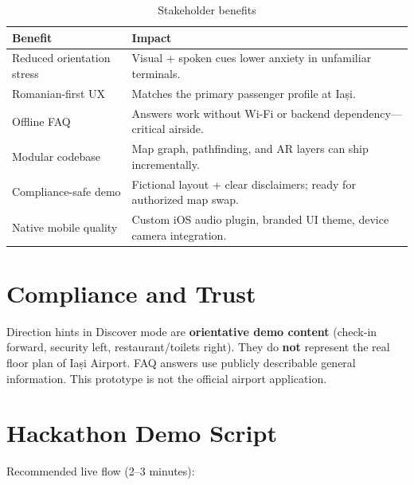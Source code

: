 \documentclass[11pt,a4paper]{article}
\begin{document}
\begin{table}[H]
\centering
\caption{Stakeholder benefits}
\begin{tabular}{@{}p{4.2cm}p{9.3cm}@{}}
\toprule
\textbf{Benefit} & \textbf{Impact} \\
\midrule
Reduced orientation stress & Visual + spoken cues lower anxiety in unfamiliar terminals. \\
Romanian-first UX & Matches the primary passenger profile at Iași. \\
Offline FAQ & Answers work without Wi-Fi or backend dependency---critical airside. \\
Modular codebase & Map graph, pathfinding, and AR layers can ship incrementally. \\
Compliance-safe demo & Fictional layout + clear disclaimers; ready for authorized map swap. \\
Native mobile quality & Custom iOS audio plugin, branded UI theme, device camera integration. \\
\bottomrule
\end{tabular}
\end{table}

\section{Compliance and Trust}

\begin{compliancebox}
Direction hints in Discover mode are \textbf{orientative demo content} (check-in forward, security left, restaurant/toilets right). They do \textbf{not} represent the real floor plan of Iași Airport. FAQ answers use publicly describable general information. This prototype is not the official airport application.
\end{compliancebox}

\section{Hackathon Demo Script}

Recommended live flow (2--3 minutes):
\end{document}
